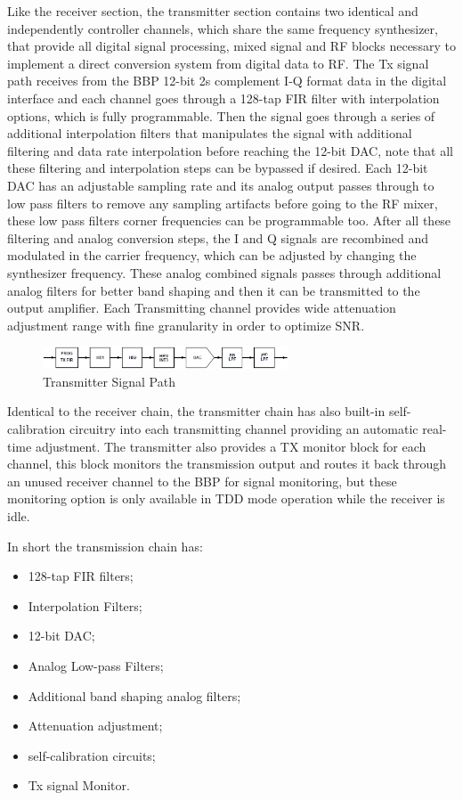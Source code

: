 Like the receiver section, the transmitter section contains two identical and independently controller channels, which share the same frequency synthesizer,  that provide all digital signal processing, mixed signal and RF blocks necessary to implement a direct conversion system from digital data to RF.
The Tx signal path receives from the BBP 12-bit 2s complement I-Q format data in the digital interface and each channel goes through a 128-tap FIR filter with interpolation options, which is fully programmable. Then the signal goes through a series of additional interpolation filters that manipulates the signal with additional filtering and data rate interpolation before reaching the 12-bit DAC, note that all these filtering and interpolation steps can be bypassed if desired.
Each 12-bit DAC has an adjustable sampling rate and its analog output passes through to low pass filters to remove any sampling artifacts before going to the RF mixer, these low pass filters corner frequencies can be programmable too. After all these filtering and analog conversion steps, the I and Q signals are recombined and modulated in the carrier frequency, which can be adjusted by changing the synthesizer frequency. These analog combined signals passes through additional analog filters for better band shaping and then it can be transmitted to the output amplifier. Each Transmitting channel provides wide attenuation adjustment range with fine granularity in order to optimize SNR.

\begin{figure}[htbp]
    \centering
    \includegraphics[width=0.65\textwidth]{./figures/tx_chain}
    \caption{ Transmitter Signal Path
    \label{fig:txchain}}
\end{figure}


Identical to the receiver chain, the transmitter chain has also built-in self-calibration circuitry into each transmitting channel providing an automatic real-time adjustment. The transmitter also provides a TX monitor block for each channel, this block monitors the transmission output and routes it back through an unused receiver channel to the BBP for signal monitoring, but these monitoring option is only available in TDD mode operation while the receiver is idle.

In short the transmission chain has:

\begin{itemize}
	\item 128-tap FIR filters;
	\item Interpolation Filters;
	\item 12-bit DAC;
	\item Analog Low-pass Filters;
	\item Additional band shaping analog filters;
	\item Attenuation adjustment;
	\item self-calibration circuits;
	\item Tx signal Monitor.
\end{itemize}


